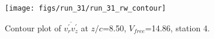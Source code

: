 \begin{figure}[H]
\centering
\texttt{[image: figs/run\_31/run\_31\_rw\_contour]}
\caption{Contour plot of $\overline{v_{r}^{\prime} v_{z}^{\prime}}$ at $z/c$=8.50, $V_{free}$=14.86, station 4.}
\label{fig:run_31_rw_contour}
\end{figure}


